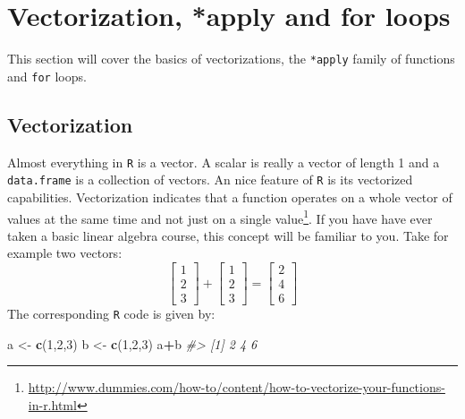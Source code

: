 \documentclass[]{book}
\makeatletter
\newenvironment{Shaded}{\begin{snugshade}}{\end{snugshade}}
\newcommand{\KeywordTok}[1]{\textcolor[rgb]{0.13,0.29,0.53}{\textbf{#1}}}
\newcommand{\DecValTok}[1]{\textcolor[rgb]{0.00,0.00,0.81}{#1}}
\newcommand{\StringTok}[1]{\textcolor[rgb]{0.31,0.60,0.02}{#1}}
\newcommand{\CommentTok}[1]{\textcolor[rgb]{0.56,0.35,0.01}{\textit{#1}}}
\newcommand{\OperatorTok}[1]{\textcolor[rgb]{0.81,0.36,0.00}{\textbf{#1}}}
\newcommand{\NormalTok}[1]{#1}
\let\rmarkdownfootnote\footnote%
\def\footnote{\protect\rmarkdownfootnote}
\newenvironment{kframe}{%
\medskip{}
\setlength{\fboxsep}{.8em}
 \def\at@end@of@kframe{}%
 \ifinner\ifhmode%
  \def\at@end@of@kframe{\end{minipage}}%
  \begin{minipage}{\columnwidth}%
 \fi\fi%
 \def\FrameCommand##1{\hskip\@totalleftmargin \hskip-\fboxsep
 \colorbox{shadecolor}{##1}\hskip-\fboxsep
     \hskip-\linewidth \hskip-\@totalleftmargin \hskip\columnwidth}%
 \MakeFramed {\advance\hsize-\width
   \@totalleftmargin\z@ \linewidth\hsize
   \@setminipage}}%
 {\par\unskip\endMakeFramed%
 \at@end@of@kframe}
\renewenvironment{Shaded}{\begin{kframe}}{\end{kframe}}
\theoremstyle{definition}
\theoremstyle{definition}
\theoremstyle{definition}
\theoremstyle{remark}
\makeatother
\begin{document}
\chapter{Vectorization, *apply and for
loops}\label{vectorization-apply-and-for-loops}

This section will cover the basics of vectorizations, the
\texttt{*apply} family of functions and \texttt{for} loops.

\section{Vectorization}\label{vectorization}

Almost everything in \texttt{R} is a vector. A scalar is really a vector
of length 1 and a \texttt{data.frame} is a collection of vectors. An
nice feature of \texttt{R} is its vectorized capabilities. Vectorization
indicates that a function operates on a whole vector of values at the
same time and not just on a single value\footnote{\url{http://www.dummies.com/how-to/content/how-to-vectorize-your-functions-in-r.html}}.
If you have have ever taken a basic linear algebra course, this concept
will be familiar to you. \newline  \vspace{0.1in} Take for example two
vectors: \newline
\vspace{0.1in} \[
\begin{bmatrix} 1 \\ 2 \\ 3 \end{bmatrix} + 
\begin{bmatrix} 1 \\ 2 \\ 3 \end{bmatrix} =
\begin{bmatrix} 2 \\ 4 \\ 6 \end{bmatrix}
\] \newline  \vspace{0.1in} The corresponding \texttt{R} code is given
by:

\begin{Shaded}
\begin{Highlighting}[]
\NormalTok{a <-}\StringTok{ }\KeywordTok{c}\NormalTok{(}\DecValTok{1}\NormalTok{,}\DecValTok{2}\NormalTok{,}\DecValTok{3}\NormalTok{)}
\NormalTok{b <-}\StringTok{ }\KeywordTok{c}\NormalTok{(}\DecValTok{1}\NormalTok{,}\DecValTok{2}\NormalTok{,}\DecValTok{3}\NormalTok{)}
\NormalTok{a}\OperatorTok{+}\NormalTok{b}
\CommentTok{#> [1] 2 4 6}
\end{Highlighting}
\end{Shaded}
\end{document}
